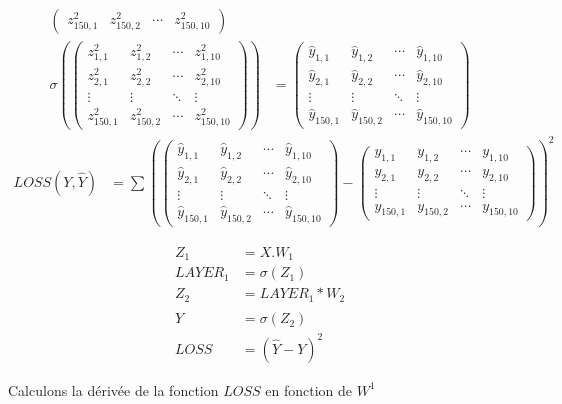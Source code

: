 \begin{footnotesize}
\begin{align*}
\begin{pmatrix}
z^2_{150,1} & z^2_{150,2} & \cdots & z^2_{150,10} 
\end{pmatrix}
\\
\sigma(
\begin{pmatrix}
z^2_{1,1} & z^2_{1,2} & \cdots & z^2_{1,10} \\
z^2_{2,1} & z^2_{2,2} & \cdots & z^2_{2,10} \\
\vdots  & \vdots  & \ddots & \vdots  \\
z^2_{150,1} & z^2_{150,2} & \cdots & z^2_{150,10}
\end{pmatrix}
)
&=
\begin{pmatrix}
\hat{y}_{1,1} & \hat{y}_{1,2} & \cdots & \hat{y}_{1,10} \\
\hat{y}_{2,1} & \hat{y}_{2,2} & \cdots & \hat{y}_{2,10} \\
\vdots  & \vdots  & \ddots & \vdots  \\
\hat{y}_{150,1} & \hat{y}_{150,2} & \cdots & \hat{y}_{150,10} 
\end{pmatrix}
\end{align*}
\begin{align*}
LOSS(Y, \hat{Y}) &= \sum (
\begin{pmatrix}
\hat{y}_{1,1} & \hat{y}_{1,2} & \cdots & \hat{y}_{1,10} \\
\hat{y}_{2,1} & \hat{y}_{2,2} & \cdots & \hat{y}_{2,10} \\
\vdots  & \vdots  & \ddots & \vdots  \\
\hat{y}_{150,1} & \hat{y}_{150,2} & \cdots & \hat{y}_{150,10} 
\end{pmatrix}
-
\begin{pmatrix}
y_{1,1} & y_{1,2} & \cdots & y_{1,10} \\
y_{2,1} & y_{2,2} & \cdots & y_{2,10} \\
\vdots  & \vdots  & \ddots & \vdots  \\
y_{150,1} & y_{150,2} & \cdots & y_{150,10} 
\end{pmatrix}
)^2
\end{align*}

\begin{align*}
Z_1 &= X.W_1 \\
LAYER_1 &= \sigma (Z_1) \\
Z_2 &= LAYER_1 * W_2 \\
\hat{Y} &= \sigma (Z_2) \\
LOSS &= (\hat{Y} -Y)^2  
\end{align*}
\end{footnotesize}

Calculons la dérivée de la fonction $LOSS$ en fonction de $W^1$

